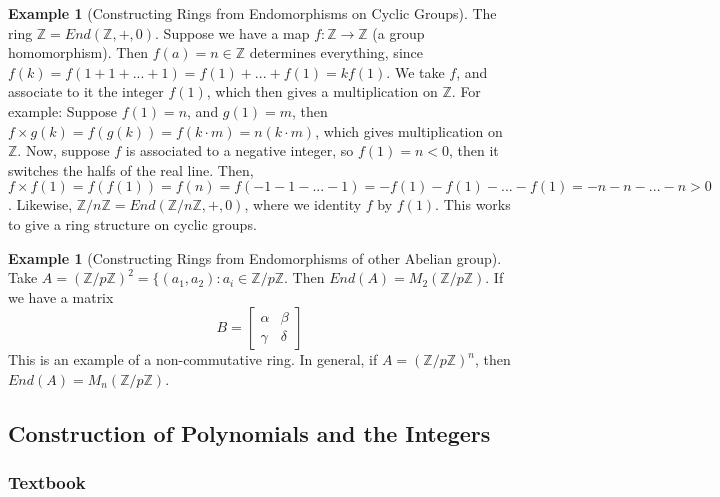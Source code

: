 \documentclass[12pt]{article}
\theoremstyle{definition}
\newtheorem{eg}[thm]{Example}
\theoremstyle{remark}
\numberwithin{equation}{section}
\newcommand\Z{\mathbb Z}    %
\begin{document}
\vspace{15pt}


\begin{eg}[Constructing Rings from Endomorphisms on Cyclic Groups]
        The ring $\Z = End(\Z,+,0)$. Suppose we have a map $f:\Z\rightarrow \Z$ (a group homomorphism). Then $f(a) = n \in \Z$ determines everything, since $f(k) = f(1+1+...+1) = f(1)+...+f(1) = kf(1)$. We take $f$, and associate to it the integer $f(1)$, which then gives a multiplication on $\Z$. For example: Suppose $f(1) = n$, and $g(1) = m$, then $f\times g(k) = f(g(k)) = f(k\cdot m) = n(k\cdot m)$, which gives multiplication on $\Z$. Now, suppose $f$ is associated to a negative integer, so $f(1) = n < 0$, then it switches the halfs of the real line. Then, $f\times f(1) = f(f(1)) = f(n) = f(-1-1-...-1) = -f(1)-f(1)-...-f(1) = -n-n-...-n > 0$. Likewise, $\Z/n\Z = End(\Z/n\Z,+,0)$, where we identity $f$ by $f(1)$. This works to give a ring structure on cyclic groups.
\end{eg}


\vspace{15pt}

\begin{eg}[Constructing Rings from Endomorphisms of other Abelian group]
        Take $A = (\Z/p\Z)^2 = \{(a_1,a_2): a_i \in \Z/p\Z$. Then $End(A) = M_2(\Z/p\Z)$. If we have a matrix \begin{equation}
                B = \begin{bmatrix} \alpha & \beta \\ \gamma & \delta \end{bmatrix}
        \end{equation}
        This is an example of a non-commutative ring. In general, if $A = (\Z/p\Z)^n$, then $End(A) = M_n(\Z/p\Z)$.
\end{eg}


\vspace{15pt}




\subsection{Construction of Polynomials and the Integers}

\subsubsection{Textbook}
\end{document}
